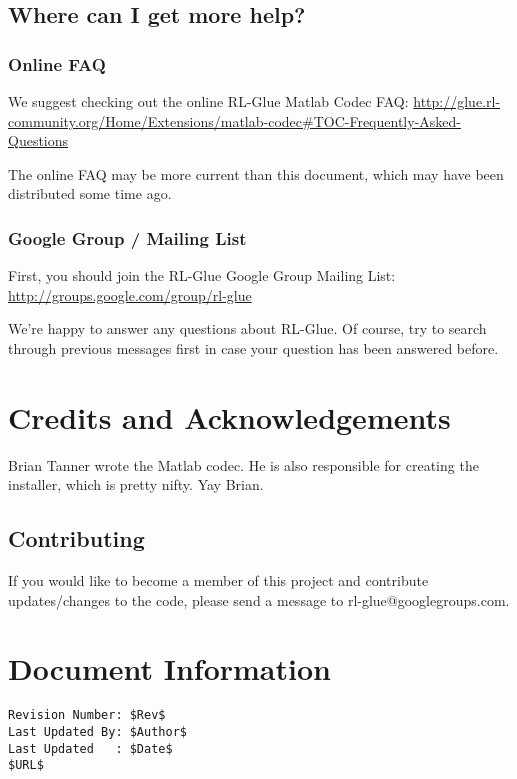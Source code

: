 \documentclass[11pt]{article}
\begin{document}
\subsection{Where can I get more help?}
\subsubsection{Online FAQ}
We suggest checking out the online RL-Glue Matlab Codec FAQ:\newline
\url{http://glue.rl-community.org/Home/Extensions/matlab-codec#TOC-Frequently-Asked-Questions}

The online FAQ may be more current than this document, which may have been distributed some time ago.

\subsubsection{Google Group / Mailing List}
First, you should join the RL-Glue Google Group Mailing List:\newline
\url{http://groups.google.com/group/rl-glue}

We're happy to answer any questions about RL-Glue.  Of course, try to search through previous messages first in case your question has been answered before.


\section{Credits and Acknowledgements}
Brian Tanner wrote the Matlab codec. He is also responsible for creating the installer, which is pretty nifty.  Yay Brian.

\subsection{Contributing}
If you would like to become a member of this project and contribute updates/changes to the code, please send a message to rl-glue@googlegroups.com.


\section*{Document Information}
\begin{verbatim}
Revision Number: $Rev$
Last Updated By: $Author$
Last Updated   : $Date$
$URL$
\end{verbatim}
\end{document}
